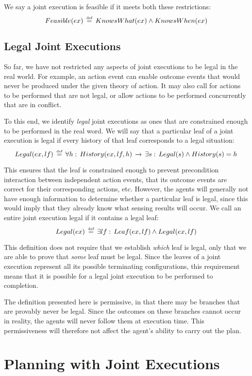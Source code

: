 We say a joint execution is feasible if it meets both these restrictions:\[
Feasible(ex)\,\stackrel{\mbox{\tiny def}}{=}\, KnowsWhat(ex)\wedge KnowsWhen(ex)\]



\subsection{Legal Joint Executions}

So far, we have not restricted any aspects of joint executions to
be legal in the real world. For example, an action event can enable
outcome events that would never be produced under the given theory
of action. It may also call for actions to be performed that are not
legal, or allow actions to be performed concurrently that are in conflict.

To this end, we identify \emph{legal} joint executions as ones that
are constrained enough to be performed in the real word. We will say
that a particular leaf of a joint execution is legal if every history
of that leaf corresponds to a legal situation:\[
Legal(ex,lf)\,\stackrel{\mbox{\tiny def}}{=}\,\forall h:\, History(ex,lf,h)\,\rightarrow\,\exists s:\, Legal(s)\wedge History(s)=h\]


This ensures that the leaf is constrained enough to prevent precondition
interaction between independent action events, that its outcome events
are correct for their corresponding actions, etc. However, the agents
will generally not have enough information to determine whether a
particular leaf is legal, since this would imply that they already
know what sensing results will occur. We call an entire joint execution
legal if it contains a legal leaf:\[
Legal(ex)\,\stackrel{\mbox{\tiny def}}{=}\,\exists lf:\, Leaf(ex,lf)\wedge Legal(ex,lf)\]


This definition does not require that we establish \emph{which} leaf
is legal, only that we are able to prove that \emph{some} leaf must
be legal. Since the leaves of a joint execution represent all its
possible terminating configurations, this requirement means that it
is possible for a legal joint execution to be performed to completion.

The definition presented here is permissive, in that there may be
branches that are provably never be legal. Since the outcomes on these
branches cannot occur in reality, the agents will never follow them
at execution time. This permissiveness will therefore not affect the
agent's ability to carry out the plan.


\section{Planning with Joint Executions\label{sec:JointExec:Planning}}

